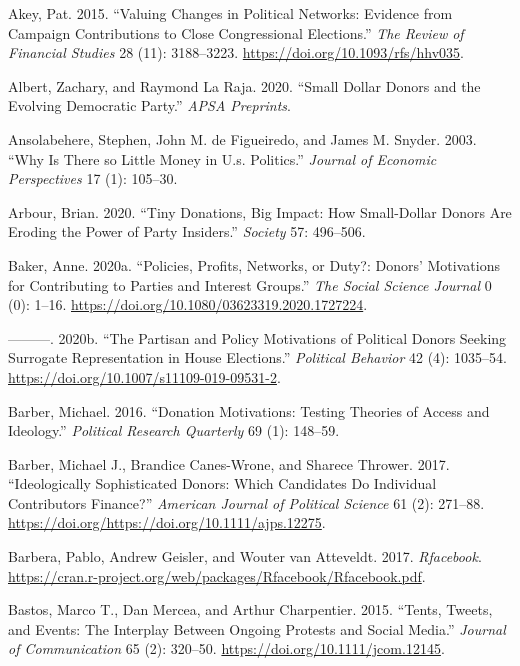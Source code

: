 \documentclass[12pt,]{article}
\begin{document}
\leavevmode\hypertarget{ref-akey2015}{}%
Akey, Pat. 2015. ``Valuing Changes in Political Networks: Evidence from
Campaign Contributions to Close Congressional Elections.'' \emph{The
Review of Financial Studies} 28 (11): 3188--3223.
\url{https://doi.org/10.1093/rfs/hhv035}.

\leavevmode\hypertarget{ref-albert2020}{}%
Albert, Zachary, and Raymond La Raja. 2020. ``Small Dollar Donors and
the Evolving Democratic Party.'' \emph{APSA Preprints}.

\leavevmode\hypertarget{ref-ansolabehere2003}{}%
Ansolabehere, Stephen, John M. de Figueiredo, and James M. Snyder. 2003.
``Why Is There so Little Money in U.s. Politics.'' \emph{Journal of
Economic Perspectives} 17 (1): 105--30.

\leavevmode\hypertarget{ref-arbour2020}{}%
Arbour, Brian. 2020. ``Tiny Donations, Big Impact: How Small-Dollar
Donors Are Eroding the Power of Party Insiders.'' \emph{Society} 57:
496--506.

\leavevmode\hypertarget{ref-baker2020a}{}%
Baker, Anne. 2020a. ``Policies, Profits, Networks, or Duty?: Donors'
Motivations for Contributing to Parties and Interest Groups.'' \emph{The
Social Science Journal} 0 (0): 1--16.
\url{https://doi.org/10.1080/03623319.2020.1727224}.

\leavevmode\hypertarget{ref-baker2020b}{}%
---------. 2020b. ``The Partisan and Policy Motivations of Political
Donors Seeking Surrogate Representation in House Elections.''
\emph{Political Behavior} 42 (4): 1035--54.
\url{https://doi.org/10.1007/s11109-019-09531-2}.

\leavevmode\hypertarget{ref-barber2016a}{}%
Barber, Michael. 2016. ``Donation Motivations: Testing Theories of
Access and Ideology.'' \emph{Political Research Quarterly} 69 (1):
148--59.

\leavevmode\hypertarget{ref-barber2017}{}%
Barber, Michael J., Brandice Canes-Wrone, and Sharece Thrower. 2017.
``Ideologically Sophisticated Donors: Which Candidates Do Individual
Contributors Finance?'' \emph{American Journal of Political Science} 61
(2): 271--88. \url{https://doi.org/https://doi.org/10.1111/ajps.12275}.

\leavevmode\hypertarget{ref-rfacebook}{}%
Barbera, Pablo, Andrew Geisler, and Wouter van Atteveldt. 2017.
\emph{Rfacebook}.
\url{https://cran.r-project.org/web/packages/Rfacebook/Rfacebook.pdf}.

\leavevmode\hypertarget{ref-bastos2015}{}%
Bastos, Marco T., Dan Mercea, and Arthur Charpentier. 2015. ``Tents,
Tweets, and Events: The Interplay Between Ongoing Protests and Social
Media.'' \emph{Journal of Communication} 65 (2): 320--50.
\url{https://doi.org/10.1111/jcom.12145}.
\end{document}
